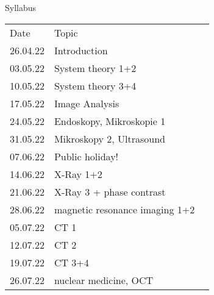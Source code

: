 \begin{frame}[c]{Syllabus}
\begin{table}[]
\begin{tabular}{rll}
\multicolumn{1}{l}{Date} & \multicolumn{1}{l}{Topic}      & \multicolumn{1}{c}{} \\
26.04.22                 & Introduction                   &                      \\
03.05.22                 & System theory 1+2              &                      \\
10.05.22                 & System theory  3+4             &                      \\
17.05.22                 & Image Analysis                 &                      \\
24.05.22                 & Endoskopy, Mikroskopie 1       &                      \\
31.05.22                 & Mikroskopy 2, Ultrasound       &                      \\
07.06.22                 & Public holiday!                &                      \\
14.06.22                 & X-Ray 1+2                      &                      \\
21.06.22                 & X-Ray 3 + phase contrast       &                      \\
28.06.22                 & magnetic resonance imaging 1+2 &                      \\
05.07.22                 & CT 1                           &                      \\
12.07.22                 & CT 2                           &                      \\
19.07.22                 & CT 3+4                         &                      \\
26.07.22                 & nuclear medicine, OCT          &                     
\end{tabular}
\end{table}
\end{frame}

